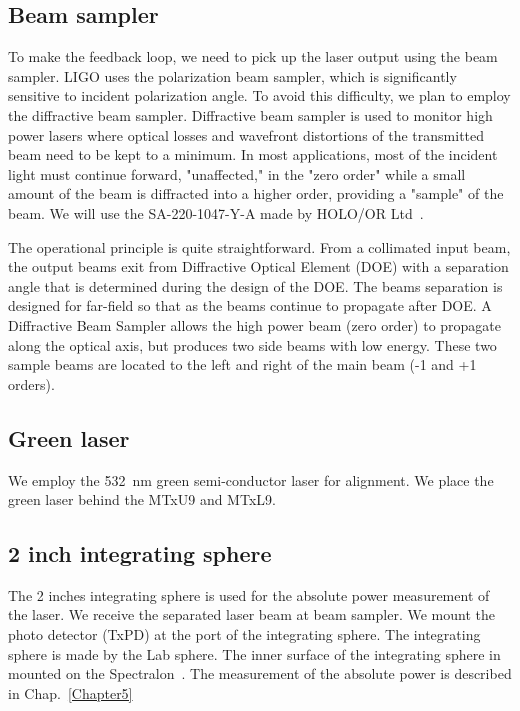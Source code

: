 \subsection{Beam sampler}
To make the feedback loop, we need to pick up the laser output using the beam sampler. LIGO uses the polarization beam sampler, which is significantly sensitive to incident polarization angle.
To avoid this difficulty, we plan to employ the diffractive beam sampler.
Diffractive beam sampler is used to monitor high power lasers where optical losses and wavefront distortions of the transmitted beam need to be kept to a minimum.
In most applications, most of the incident light must continue forward, "unaffected," in the "zero order" while a small amount of the beam is diffracted into a higher order, providing a "sample" of the beam. We will use the SA-220-1047-Y-A made by HOLO/OR Ltd~\cite{}.

The operational principle is quite straightforward. From a collimated input beam, the output beams exit from Diffractive Optical Element (DOE) with a separation angle that is determined during the design of the DOE. The beams separation is designed for far-field so that as the beams continue to propagate after DOE.
A Diffractive Beam Sampler allows the high power beam (zero order) to propagate along the optical axis, but produces two side beams with low energy. These two sample beams are located to the left and right of the main beam (-1 and +1 orders).

\subsection{Green laser}
We employ the 532~nm green semi-conductor laser for alignment. We place the green laser behind the MTxU9 and MTxL9.  

\subsection{2 inch integrating sphere}
The 2 inches integrating sphere is used for the absolute power measurement of the laser. We receive the separated laser beam at beam sampler. We mount the photo detector (TxPD) at the port of the integrating sphere. The integrating sphere is made by the Lab sphere. The inner surface of the integrating sphere in mounted on the Spectralon~\cite{Spectralon}. The measurement of the absolute power is described in Chap.~\ref{Chapter5}

